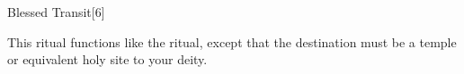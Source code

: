 \begin{spellsection}{Blessed Transit}[6]

\begin{spellcontent}

\begin{spelltargetinginfo}



\end{spelltargetinginfo}


\begin{spelleffects}



\spelleffect
This ritual functions like the  ritual, except that the destination must be a temple or equivalent holy site to your deity.








\end{spelleffects}

\end{spellcontent}
\begin{spellfooter}


\end{spellfooter}
\begin{spellsubcontent}


\end{spellsubcontent}
\end{spellsection}


